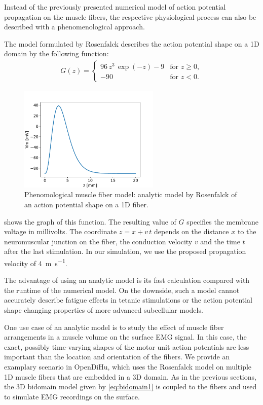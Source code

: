 Instead of the previously presented numerical model of action potential propagation on the muscle fibers, the respective physiological process can also be described with a phenomenological approach.

The model formulated by Rosenfalck \cite{Rosenfalck1969} describes the action potential shape on a 1D domain by the following function:
%
\begin{align*}
  G(z) = \begin{cases}
    96\,z^3\,\exp(-z) - 9 & \text{for } z \geq 0,\\[4mm]
    -90  & \text{for } z < 0.
  \end{cases}  
\end{align*}

\begin{figure}
  \centering%
  \includegraphics[width=0.6\textwidth]{images/results/application/rosenfalck_function.pdf}%
  \caption{Phenomological muscle fiber model: analytic model by Rosenfalck of an action potential shape on a 1D fiber.}%
  \label{fig:rosenfalck_function}%
\end{figure}
 shows the graph of this function. The resulting value of $G$ specifies the membrane voltage in millivolts. The coordinate $z=x+v\,t$ depends on the distance $x$ to the neuromuscular junction on the fiber, the conduction velocity $v$ and the time $t$ after the last stimulation. In our simulation, we use the proposed propagation velocity of \SI{4}{\meter\per\second}.

The advantage of using an analytic model is its fast calculation compared with the runtime of the numerical model. On the downside, such a model cannot accurately describe fatigue effects in tetanic stimulations or the action potential shape changing properties of more advanced subcellular models.

One use case of an analytic model is to study the effect of muscle fiber arrangements in a muscle volume on the surface EMG signal. In this case, the exact, possibly time-varying shapes of the motor unit action potentials are less important than the location and orientation of the fibers.
We provide an examplary scenario in OpenDiHu, which uses the Rosenfalck model on multiple 1D muscle fibers that are embedded in a 3D domain. As in the previous sections, the 3D bidomain model given by \cref{eq:bidomain1} is coupled to the fibers and used to simulate EMG recordings on the surface. 

